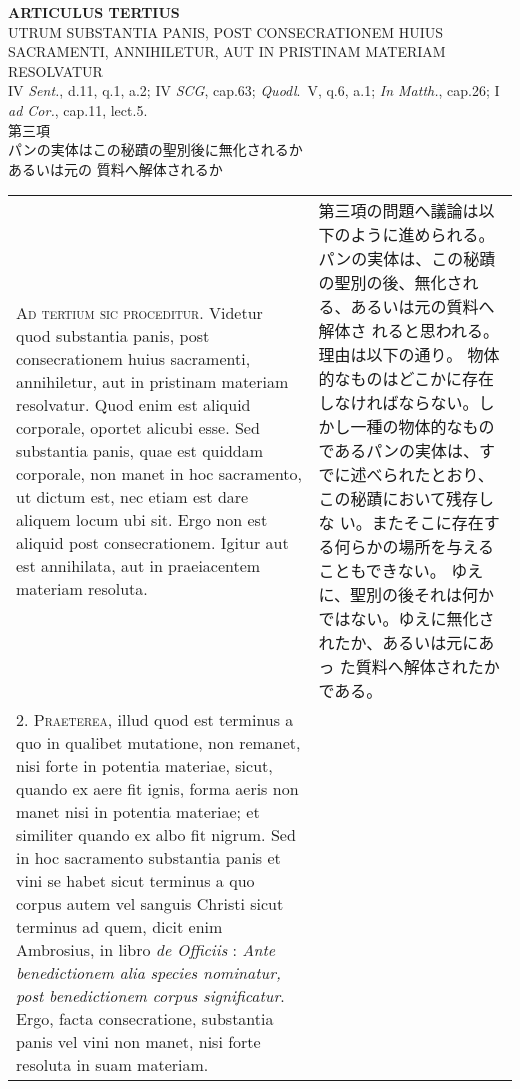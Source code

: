 \documentclass[10pt]{jsarticle} %
\begin{document}
\begin{center}
{\Large {\bf ARTICULUS TERTIUS}}\\
{\large UTRUM SUBSTANTIA PANIS, POST CONSECRATIONEM HUIUS SACRAMENTI,
 ANNIHILETUR, AUT IN PRISTINAM MATERIAM RESOLVATUR}\\
{\footnotesize IV {\itshape Sent.}, d.11, q.1, a.2; IV {\itshape SCG},
 cap.63; {\itshape Quodl}.~V, q.6, a.1; {\itshape In Matth.}, cap.26; I
 {\itshape ad Cor.}, cap.11, lect.5.}\\
{\Large 第三項\\パンの実体はこの秘蹟の聖別後に無化されるか\\あるいは元の
質料へ解体されるか}
\end{center}

\begin{longtable}{p{21em}p{21em}}


{\scshape Ad tertium sic proceditur}. Videtur quod substantia panis, post
consecrationem huius sacramenti, annihiletur, aut in pristinam
materiam resolvatur. Quod enim est aliquid corporale, oportet alicubi
esse. Sed substantia panis, quae est quiddam corporale, non manet in
hoc sacramento, ut dictum est, nec etiam est dare aliquem locum ubi
sit. Ergo non est aliquid post consecrationem. Igitur aut est
annihilata, aut in praeiacentem materiam resoluta.

&

第三項の問題へ議論は以下のように進められる。
パンの実体は、この秘蹟の聖別の後、無化される、あるいは元の質料へ解体さ
 れると思われる。理由は以下の通り。
物体的なものはどこかに存在しなければならない。しかし一種の物体的なもの
 であるパンの実体は、すでに述べられたとおり、この秘蹟において残存しな
 い。またそこに存在する何らかの場所を与えることもできない。
ゆえに、聖別の後それは何かではない。ゆえに無化されたか、あるいは元にあっ
 た質料へ解体されたかである。

\\



2. {\scshape Praeterea}, illud quod est terminus a quo in qualibet mutatione, non
remanet, nisi forte in potentia materiae, sicut, quando ex aere fit
ignis, forma aeris non manet nisi in potentia materiae; et similiter
quando ex albo fit nigrum. Sed in hoc sacramento substantia panis et
vini se habet sicut terminus a quo corpus autem vel sanguis Christi
sicut terminus ad quem, dicit enim Ambrosius, in libro {\itshape de
 Officiis} : {\itshape Ante benedictionem alia species nominatur, post benedictionem corpus
significatur}. Ergo, facta consecratione, substantia panis vel vini non
manet, nisi forte resoluta in suam materiam.


\end{longtable}
\end{document}
